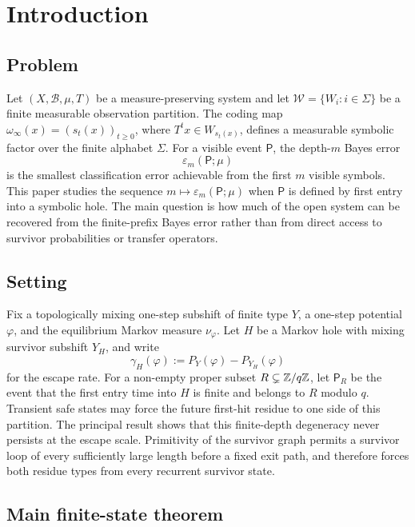 \section{Introduction}\label{sec:introduction}

\subsection*{Problem}

Let \((X,\mathcal{B},\mu,T)\) be a measure-preserving system and let
\(\mathcal W=\{W_i:i\in\Sigma\}\) be a finite measurable observation
partition.  The coding map
\(\omega_\infty(x)=(s_t(x))_{t\geq 0}\), where
\(T^t x\in W_{s_t(x)}\), defines a measurable symbolic factor over the
finite alphabet \(\Sigma\).  For a visible event \(\mathsf P\), the
depth-\(m\) Bayes error
\[
  \varepsilon_m(\mathsf P;\mu)
\]
is the smallest classification error achievable from the first \(m\)
visible symbols.  This paper studies the sequence
\(m\mapsto \varepsilon_m(\mathsf P;\mu)\) when \(\mathsf P\) is defined
by first entry into a symbolic hole.  The main question is how much of
the open system can be recovered from the finite-prefix Bayes error
rather than from direct access to survivor probabilities or transfer
operators.

\subsection*{Setting}

Fix a topologically mixing one-step subshift of finite type \(Y\), a
one-step potential \(\varphi\), and the equilibrium Markov measure
\(\nu_\varphi\).  Let \(H\) be a Markov hole with mixing survivor
subshift \(Y_H\), and write
\[
  \gamma_H(\varphi):=P_Y(\varphi)-P_{Y_H}(\varphi)
\]
for the escape rate.  For a non-empty proper subset
\(R\subsetneq \mathbb{Z}/q\mathbb{Z}\), let \(\mathsf P_R\) be the event that the
first entry time into \(H\) is finite and belongs to \(R\) modulo
\(q\).
Transient safe states may force the future first-hit residue to one side
of this partition.  The principal result shows that this finite-depth
degeneracy never persists at the escape scale.  Primitivity of the
survivor graph permits a survivor loop of every sufficiently large
length before a fixed exit path, and therefore forces both residue types
from every recurrent survivor state.

\subsection*{Main finite-state theorem}

